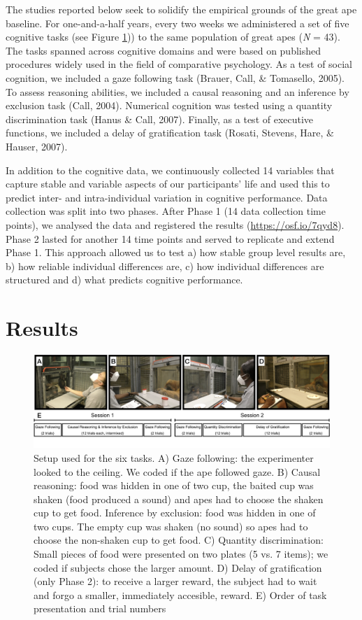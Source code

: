 \documentclass[
  man,floatsintext]{apa6}
\begin{document}
The studies reported below seek to solidify the empirical grounds of the great ape baseline. For one-and-a-half years, every two weeks we administered a set of five cognitive tasks (see Figure \ref{fig:setup})) to the same population of great apes (\emph{N} = 43). The tasks spanned across cognitive domains and were based on published procedures widely used in the field of comparative psychology. As a test of social cognition, we included a gaze following task (Brauer, Call, \& Tomasello, 2005). To assess reasoning abilities, we included a causal reasoning and an inference by exclusion task (Call, 2004). Numerical cognition was tested using a quantity discrimination task (Hanus \& Call, 2007). Finally, as a test of executive functions, we included a delay of gratification task (Rosati, Stevens, Hare, \& Hauser, 2007).

In addition to the cognitive data, we continuously collected 14 variables that capture stable and variable aspects of our participants' life and used this to predict inter- and intra-individual variation in cognitive performance. Data collection was split into two phases. After Phase 1 (14 data collection time points), we analysed the data and registered the results (\url{https://osf.io/7qyd8}). Phase 2 lasted for another 14 time points and served to replicate and extend Phase 1. This approach allowed us to test a) how stable group level results are, b) how reliable individual differences are, c) how individual differences are structured and d) what predicts cognitive performance.

\hypertarget{results}{%
\section{Results}\label{results}}

\begin{figure}
\includegraphics[width=1\linewidth]{./figures/setup} \caption{Setup used for the six tasks. A) Gaze following: the experimenter looked to the ceiling. We coded if the ape followed gaze. B) Causal reasoning: food was hidden in one of two cup, the baited cup was shaken (food produced a sound) and apes had to choose the shaken cup to get food. Inference by exclusion: food was hidden in one of two cups. The empty cup was shaken (no sound) so apes had to choose the non-shaken cup to get food. C) Quantity discrimination: Small pieces of food were presented on two plates (5 vs. 7 items); we coded if subjects chose the larger amount. D) Delay of gratification (only Phase 2): to receive a larger reward, the subject had to wait and forgo a smaller, immediately accesible, reward. E) Order of task presentation and trial numbers}\label{fig:setup}
\end{figure}
\end{document}
